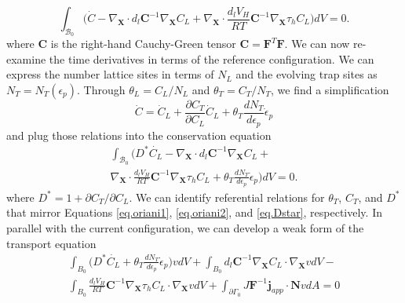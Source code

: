 \documentclass[10pt]{elsarticle}
\newcommand{\mbs}[1]{\boldsymbol{#1}}
\def\bs{{\mbs{s}}} \def\bt{{\mbs{t}}} \def\bu{{\mbs{u}}}
\def\bs{\boldsymbol}
\begin{document}
%
%
\begin{equation}
\label{eq.hconservationref3} \int_{\mathcal{B}_{0}} \bigg( \dot{C} -   \nabla_{\bs{X}}  \cdot d_{l} \bs{C}^{-1}  \nabla_{\bs{X}} C_{L}  +   \nabla_{\bs{X}}  \cdot \frac{ d_{l} V_{H}}{RT} \bs{C}^{-1} \nabla_{\bs{X}} \tau_{h} C_{L} \bigg) dV = 0.
\end{equation}
%
where $\bs{C}$ is the right-hand Cauchy-Green tensor $\bs{C} = \bs{F}^{T}\bs{F}$. We can now re-examine the time derivatives in terms of the reference configuration. We can express the number lattice sites in terms of $N_{L}$ and the evolving trap sites as $N_{T} = N_{T}(\epsilon_{p})$. Through $\theta_{L} = C_{L}/N_{L}$ and $\theta_{T} = C_{T}/N_{T}$, we find a simplification
%
\begin{equation}
\label{eq.cdotref}{\dot{C} = \dot{C}_{L} + \frac{\partial C_{T}}{\partial C_{L}} \dot{C}_{L} +\theta_{T} \frac{d N_{T}}{d \epsilon_{p}} \dot{\epsilon}_{p}} 
\end{equation}
and plug those relations into the conservation equation
%
\begin{align}
\label{eq.hconservationref4} \int_{\mathcal{B}_{0}} \bigg( D^{*}\dot{C_{L}} -   \nabla_{\bs{X}}  \cdot d_{l} \bs{C}^{-1}  \nabla_{\bs{X}} C_{L}  +   \nonumber \\ \nabla_{\bs{X}}  \cdot \frac{d_{l} V_{H}}{RT} \bs{C}^{-1} \nabla_{\bs{X}} \tau_{h} C_{L} + \theta_{T} \frac{d N_{T}}{d \epsilon_{p}} \dot{\epsilon}_{p} \bigg) dV = 0.
\end{align}
where $D^{*} = 1 + \partial C_{T}/ \partial C_{L}$. We can identify referential relations for $\theta_{T}$, $C_{T}$, and $D^{*}$  that mirror Equations \ref{eq.oriani1}, \ref{eq.oriani2}, and \ref{eq.Dstar}, respectively. In parallel with the current configuration, we can develop a weak form of the transport equation
%
\begin{align}
\label{eq.hconservationref5} \int_{B_{0}} \bigg( D^{*}\dot{C_{L}} +  \theta_{T} \frac{d N_{T}}{d \epsilon_{p}} \dot{\epsilon}_{p} \bigg)vdV  + \int_{B_{0}}  d_{l} \bs{C}^{-1}  \nabla_{\bs{X}} C_{L}  \cdot  \nabla_{\bs{X}}v dV - \nonumber \\ \int_{B_{0}}  \frac{d_{l} V_{H}}{RT} \bs{C}^{-1} \nabla_{\bs{X}} \tau_{h}C_{L}  \cdot \nabla_{\bs{X}}v dV + \int_{\partial \Gamma_{0}} J\bs{F}^{-1}\bs{j}_{app} \cdot \bs{N}vdA = 0
\end{align}
\end{document}
